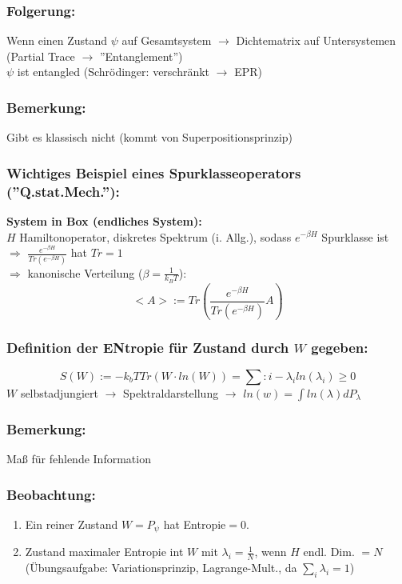 \documentclass[twoside,a4paper]{scrartcl}
\renewcommand{\1}{\mathds{1}}
\newcommand{\Ra}{\Rightarrow}
\newcommand{\ra}{\rightarrow}
\renewcommand{\l}{\lambda}
\begin{document}
\subsubsection*{Folgerung:} 
Wenn einen Zustand $\psi$ auf Gesamtsystem $\ra$ Dichtematrix auf Untersystemen (Partial Trace $\ra$ ''Entanglement'')\\
$\psi$ ist entangled (Schrödinger: verschränkt $\ra$ EPR)
\subsubsection*{Bemerkung:} 
Gibt es klassisch nicht (kommt von Superpositionsprinzip)
\subsubsection*{Wichtiges Beispiel eines Spurklasseoperators (''Q.stat.Mech.''):} 
\textbf{System in Box (endliches System):}\\
$H$ Hamiltonoperator, diskretes Spektrum (i. Allg.), sodass $e^{-\beta H}$ Spurklasse ist $\Ra$ $\frac{e^{-\beta H}}{Tr(e^{-\beta H})}$ hat $Tr=1$\\
$\Ra$ kanonische Verteilung ($\beta=\frac{1}{k_B T}$):
$$<A>:= Tr(\frac{e^{-\beta H}}{Tr(e^{-\beta H})}A)$$
\subsubsection*{Definition der ENtropie für Zustand durch $W$ gegeben:} 
$$S(W):=-k_b T Tr(W \cdot ln(W))=\sum:i -\l_i ln(\l_i)\geq 0$$
$W$ selbstadjungiert $\ra$ Spektraldarstellung $\ra$ $ln(w)=\int ln(\l) dP_\l$
\subsubsection*{Bemerkung:} 
Maß für fehlende Information
\subsubsection*{Beobachtung:} 
\begin{enumerate}
\item Ein reiner Zustand $W=P_\psi$ hat Entropie$=0$.
\item Zustand maximaler Entropie int $W$ mit $\l_i=\frac{1}{N}$, wenn $H$ endl. Dim. $=N$ (Übungsaufgabe: Variationsprinzip, Lagrange-Mult., da $\sum_i \l_i=1$)
\end{enumerate}
\end{document}
